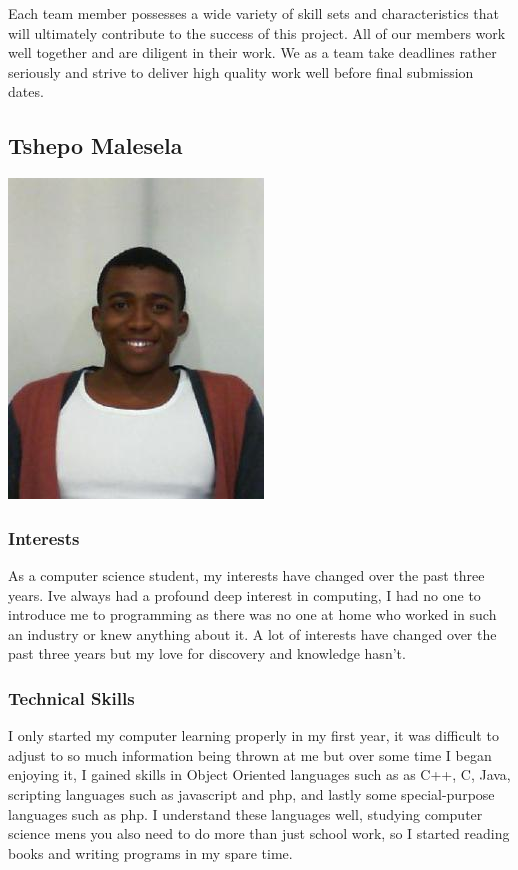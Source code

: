 \documentclass[a4paper,12pt]{article}
\begin{document}
	{\noindent}Each team member possesses a wide variety of skill sets and characteristics that will ultimately contribute to the success of this project. All of our members work well together and are diligent in their work. We as a team take deadlines rather seriously and strive to deliver high quality work well before final submission dates.  
	
		\newpage
		\subsection{Tshepo Malesela}
		\includegraphics[scale=0.8]{./Pictures/Tshepo.jpeg}\\
			\subsubsection{Interests}
			As a computer science student, my interests have changed over the past three years. Ive always had a profound deep interest in computing, I had no one to introduce me to programming as there was no one at home who worked in such an industry or knew anything about it. A lot of interests have changed over the past three years but my love for discovery and knowledge hasn't.
			
			\subsubsection{Technical Skills}
			I only started my computer learning properly in  my first year, it was difficult to adjust to so much information being thrown at me but over some time I began enjoying it, I gained skills in Object Oriented languages such as  as C++, C, Java, scripting languages such as javascript and php, and lastly some special-purpose languages such as php. I understand these languages well, studying computer science mens you also need to do more than just school work, so I started reading books and writing programs in my spare time.
			
\end{document}
